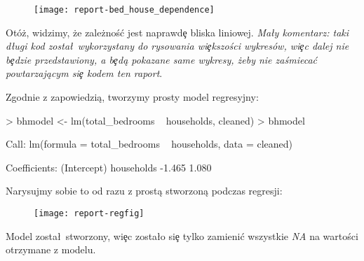 \documentclass{article}
\begin{document}
\begin{figure}[h!]
\centering
\begin{Schunk}
\end{Schunk}
\texttt{[image: report-bed\_house\_dependence]}
\end{figure}

\noindent
\quad Otóż, widzimy, że zależnoś\'c jest naprawd\c e bliska liniowej. \textit{Ma\l y komentarz: taki d\l ugi kod zosta\l\ wykorzystany do rysowania wi\c ekszości wykresów, wi\c ec dalej nie b\c edzie przedstawiony, a b\c edą pokazane same wykresy, żeby nie zaśmieca\'c powtarzającym si\c e kodem ten raport}.

\noindent
\quad Zgodnie z zapowiedzią, tworzymy prosty model regresyjny:

\begin{Schunk}
\begin{Sinput}
> bhmodel <- lm(total_bedrooms ~ households, cleaned)
> bhmodel
\end{Sinput}
\begin{Soutput}
Call:
lm(formula = total_bedrooms ~ households, data = cleaned)

Coefficients:
(Intercept)   households  
     -1.465        1.080  
\end{Soutput}
\end{Schunk}

\noindent
\quad Narysujmy sobie to od razu z prostą stworzoną podczas regresji:

\begin{figure}[h!]
\centering
\texttt{[image: report-regfig]}
\end{figure}

\noindent
\quad Model zosta\l\ stworzony, wi\c ec zosta\l o si\c e tylko zamieni\'c wszystkie \textit{NA} na wartości otrzymane z modelu.
\end{document}
